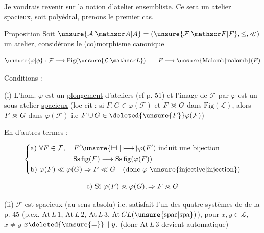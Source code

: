 

Je voudrais revenir sur la notion d'\uline{atelier ensembliste}. Ce sera un atelier  spacieux, soit polyédral, prenons le premier cas.

\uline{Proposition} Soit $\unsure{\mathcal A|\mathscr A|A}=(\unsure{\mathcal F|\mathscr F|F},\leq,\ll)$ un atelier, considérons le (co)morphisme canonique

\[
\unsure{\varphi|\phi}:\mathcal F\longrightarrow\mathrm{Fig}(\unsure{\mathcal L|\mathscr L})\qquad F\longmapsto\unsure{\mathrm{Malomb}|\mathrm{malomb}}(F)
\]

 Conditions : 

(i) L'hom. $\varphi$ est un \uline{plongement} d'ateliers (cf   p. 51) et l'image de $\mathcal F$ par $\varphi$ est un sous-atelier \uline{spacieux} (loc cit  : si $F,G\in\varphi(\mathcal F)$ et $F\mathrel{>\mkern-13mu<}G$  dans $\mathrm{Fig}(\mathcal L)$, alors $F\mathrel{>\mkern-13mu<}G$ dans $\varphi(\mathcal F)$ i.e $F\cup G\in\deleted{\unsure{F}}\varphi(\mathcal F)$)

En d'autres termes :


\[
\left\{\begin{aligned}
&\text{a) }\forall F\in\mathcal F,\quad F'\unsure{\mathrel{\vdash\mkern-6mu\dashv}|\longmapsto}\varphi(F')\ \text{induit une bijection}\\
&\hspace{6em}\mathrm{Ss\,fig}(F)\longrightarrow\mathrm{Ss\,fig}(\varphi(F))\\
&\text{b) }\varphi(F)\ll\varphi(G)\Rightarrow F\ll G\quad(\text{donc }\varphi\ \text{\unsure{injective|injection}})
\end{aligned}\right.
\]


\[
\text{c) Si }\varphi(F)\mathrel{>\mkern-13mu<}\varphi(G),\Rightarrow F\mathrel{>\mkern-13mu<}G
\]

(ii) $\mathcal F$ est \uline{spacieux} (au sens absolu) i.e. satisfait  l'un des quatre systèmes  de  de la p. 45  (p.ex. $\mathrm{At}\,L\,1$, $\mathrm{At}\,L\,2$, $\mathrm{At}\,L\,3$, $\mathrm{At}\,CL(\unsure{\mathrm{spac}|\mathrm{spa}})$),  pour $x,y\in\mathcal L$, $x\ne y$ \inserted{$\Rightarrow$} $x\deleted{\unsure{=}}\parallel y$. (donc $\mathrm{At}\,L\,3$ devient automatique)

